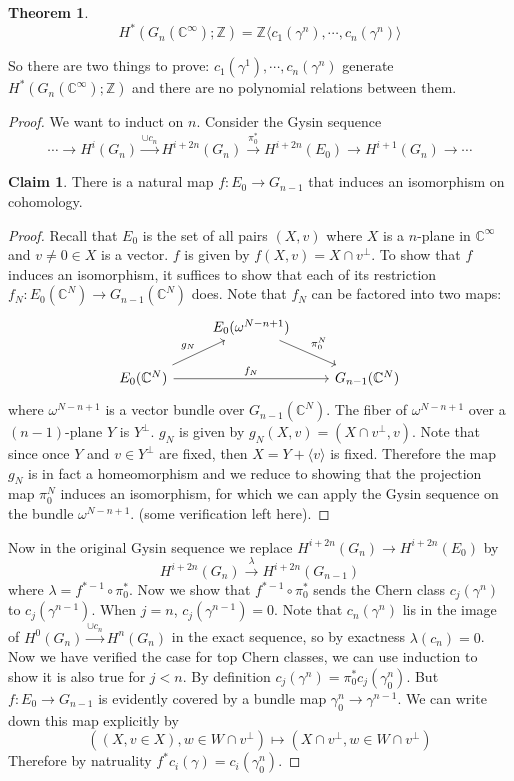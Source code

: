 \documentclass[12pt]{article}
\theoremstyle{plain}
\newtheorem{theorem}[equation]{Theorem}
\theoremstyle{definition}
\newtheorem*{claim}{Claim}
\newcommand{\IC}{\mathbb{C}}
\newcommand{\IZ}{\mathbb{Z}}
\newcommand{\<}{\langle}
\renewcommand{\>}{\rangle}
\newcommand{\w}{\omega}
\begin{document}
\begin{theorem}
$$H^*(G_n(\IC^\infty); \IZ) = \IZ \< c_1(\gamma^n), \cdots, c_n(\gamma^n) \>$$
\end{theorem}
So there are two things to prove: $c_1(\gamma^1), \cdots, c_n(\gamma^n)$ generate $H^*(G_n(\IC^\infty); \IZ)$ and there are no polynomial relations between them. 
\begin{proof}We want to induct on $n$.
Consider the Gysin sequence 
$$ \cdots \longrightarrow H^i(G_n) \stackrel{\cup c_n}{\longrightarrow} H^{i + 2n} (G_n) \stackrel{\pi_0^*}{\longrightarrow} H^{i + 2n}(E_0) \longrightarrow H^{i+1}(G_n) \longrightarrow \cdots $$
\begin{claim}
There is a natural map $f : E_0 \to G_{n-1}$ that induces an isomorphism on cohomology. 
\end{claim}
\begin{proof}
Recall that $E_0$ is the set of all pairs $(X, v)$ where $X$ is a $n$-plane in $\IC^\infty$ and $v \neq 0 \in X$ is a vector. $f$ is given by $f(X, v) = X \cap v^\perp$. To show that $f$ induces an isomorphism, it suffices to show that each of its restriction $f_N : E_0(\IC^N) \to G_{n-1}(\IC^N)$ does. Note that $f_N$ can be factored into two maps:
\[
\begin{tikzcd}
{} & E_0(\w^{N - n + 1}) \arrow{dr}{\pi_0^N} \\
E_0(\IC^N) \arrow{ur}{g_N} \arrow{rr}{f_N} && G_{n-1}(\IC^N)
\end{tikzcd}
\]
where $\w^{N - n + 1}$ is a vector bundle over $G_{n-1}(\IC^N)$. The fiber of $\w^{N - n + 1}$ over a $(n-1)$-plane $Y$ is $Y^\perp$. $g_N$ is given by $g_N(X, v) = (X \cap v^\perp, v)$. Note that since once $Y$ and $v \in Y^\perp$ are fixed, then $X = Y + \< v\>$ is fixed. Therefore the map $g_N$ is in fact a homeomorphism and we reduce to showing that the projection map $\pi_0^N$ induces an isomorphism, for which we can apply the Gysin sequence on the bundle $\w^{N - n + 1}$. (some verification left here). 
\end{proof}
Now in the original Gysin sequence we replace $H^{i + 2n}(G_n) \to H^{i + 2n}(E_0)$ by 
$$ H^{i + 2n}(G_n) \stackrel{\lambda}{\longrightarrow} H^{i + 2n}(G_{n - 1})$$
where $\lambda = f^{* -1}\circ \pi_0^*$.
Now we show that $f^{* -1}\circ \pi_0^*$ sends the Chern class $c_j(\gamma^n)$ to $c_j(\gamma^{n - 1})$. When $j = n$, $c_j(\gamma^{n - 1}) = 0$. Note that $c_n(\gamma^n)$ lis in the image of $H^0(G_n) \stackrel{\cup c_n}{\longrightarrow} H^n(G_n)$ in the exact sequence, so by exactness $\lambda(c_n) = 0$. Now we have verified the case for top Chern classes, we can use induction to show it is also true for $j < n$. By definition $c_j(\gamma^n) = \pi_0^* c_j(\gamma^n_0)$. But $f : E_0 \to G_{n - 1}$ is evidently covered by a bundle map $\gamma^n_0 \to \gamma^{n - 1}$. We can write down this map explicitly by 
$$ ((X, v \in X), w \in W \cap v^\perp) \mapsto (X \cap v^\perp, w \in  W \cap v^\perp)$$
Therefore by natruality $f^* c_i(\gamma) = c_i(\gamma_0^n)$. 


\end{proof}
\end{document}
